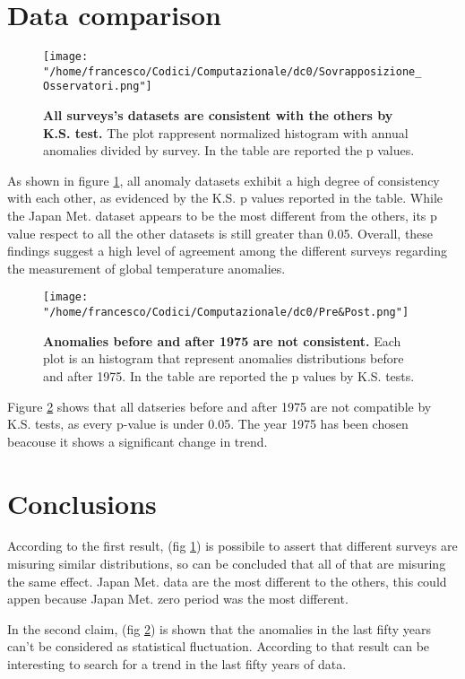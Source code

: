 \documentclass[a4paper,11pt,rmp,superscriptaddress]{revtex4}
\begin{document}
\section*{Data comparison}
\begin{figure}[h!]
    \centering
    \texttt{[image: "/home/francesco/Codici/Computazionale/dc0/Sovrapposizione\_Osservatori.png"]}
    \caption[short]{\textbf{All surveys's datasets are consistent with the others by K.S. test.} The plot rappresent normalized histogram with 
    annual anomalies divided by survey. In the table are reported the p values.} 
    \label{fig:1}
\end{figure}
As shown in figure \ref*{fig:1}, all anomaly datasets exhibit a high degree of consistency with each other, 
as evidenced by the K.S. p values reported in the table. 
While the Japan Met. dataset appears to be the most different from the others, 
its p value respect to all the other datasets is still greater than 0.05. 
Overall, these findings suggest a high level of agreement among the different surveys 
regarding the measurement of global temperature anomalies.

\begin{figure}[h!]
    \centering
    \texttt{[image: "/home/francesco/Codici/Computazionale/dc0/Pre\&Post.png"]}
    \caption[short]{\textbf{Anomalies before and after 1975 are not consistent.} Each plot is an histogram that 
    represent anomalies distributions before and after 1975. In the table are reported the p values by K.S. tests.}
    \label{fig:2}
\end{figure}
Figure \ref*{fig:2} shows that all datseries before and after 1975 are not compatible by K.S. tests,
as every p-value is under 0.05. The year 1975 has been chosen beacouse it shows a significant change in trend.


\section*{Conclusions}
According to the first result, (fig \ref*{fig:1}) is possibile to assert that different surveys are misuring similar distributions,
so can be concluded that all of that are misuring the same effect. Japan Met. data are the most different to the others, this could 
appen because Japan Met. zero period was the most different. 

In the second claim, (fig \ref*{fig:2}) is shown that the anomalies in the last fifty years can't be considered as statistical fluctuation.
According to that result can be interesting to search for a trend in the last fifty years of data.
\end{document}
